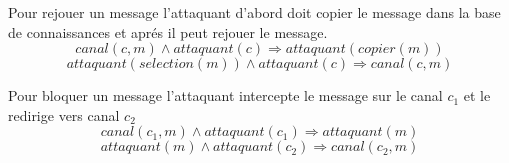 \documentclass[10pt,a4paper]{article}
\begin{document}
Pour rejouer un message l'attaquant d'abord doit copier le message dans la base de connaissances et aprés il peut rejouer le message.
\begin{equation}
canal(c,m)\wedge attaquant(c)\Longrightarrow attaquant(copier(m))
\end{equation}
\begin{equation}
attaquant(selection(m))\wedge attaquant(c)\Longrightarrow canal(c,m) 
\end{equation}

Pour bloquer un message l’attaquant intercepte le message sur le canal $c_{1}$ et le redirige vers canal $c_{2}$
\begin{equation}
canal(c_{1},m)\wedge attaquant(c_{1})\Longrightarrow attaquant(m)
\end{equation}
\begin{equation}
attaquant(m)\wedge attaquant(c_{2})\Longrightarrow canal(c_{2},m) 
\end{equation}
\end{document}
